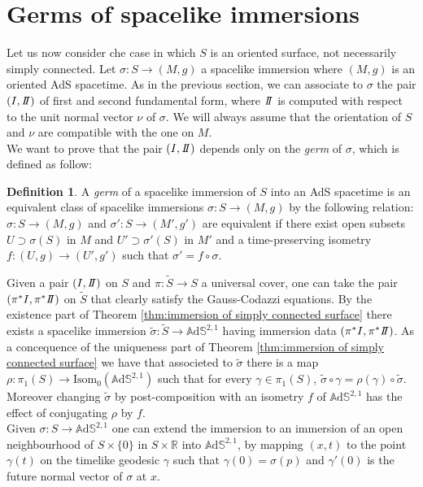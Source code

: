 \documentclass[10pt,a4paper,oneside,reqno]{book}
\def\R{\mathbb{R}}
\def\A{\mathbb{A}\mathrm{d}\mathbb{S}}
\newcommand{\I}{I}
\newcommand{\II}{I\hspace{-0.1cm}I}
\theoremstyle{plain}
\theoremstyle{definition}
\newtheorem{definition}[theorem]{Definition} %
\theoremstyle{plain}
\theoremstyle{plain}
\theoremstyle{mystyleNormalFont}
\begin{document}
\section{Germs of spacelike immersions}
Let us now consider che case in which $S$ is an oriented surface, not necessarily simply connected. Let $\sigma: S \to(M,g)$ a spacelike immersion where $(M,g)$ is an oriented AdS spacetime.
As in the previous section, we can associate to $\sigma$ the pair $(\I,\II)$ of first and second  fundamental form, where $\II$ is  computed with respect to the unit normal vector $\nu$ of $\sigma$.
We will always assume that the orientation of $S$ and $\nu$ are compatible with the one on $M$.\\
We want to prove that the pair $(\I,\II)$ depends only on the \textit{germ} of $\sigma$, which is defined as follow:
\begin{definition}
    A \textit{germ} of a spacelike immersion of $S$ into an AdS spacetime is an equivalent class of spacelike immersions $\sigma:S \to(M,g)$ by the following relation: $\sigma:S \to(M,g)$ and $\sigma':S \to(M',g')$ are equivalent if there exist open subsets $U \supset \sigma(S)$ in $M$ and $U' \supset \sigma'(S)$ in $M'$ and a time-preserving isometry $f:(U,g)\to(U',g')$ such that $\sigma' = f \circ \sigma$.
\end{definition}
Given a pair $(\I,\II)$ on $S$ and $\pi: \widetilde{S}\to S$ a universal cover, one can take the pair $(\pi^*\I, \pi^*\II)$ on $\widetilde{S}$ that clearly satisfy the Gauss-Codazzi equations. By the existence part of Theorem \ref{thm:immersion of simply connected surface} there exists a spacelike immersion $\widetilde{\sigma}: \widetilde{S} \to\A^{2,1}$ having immersion data $(\pi^*\I, \pi^*\II)$. As a concequence of the uniqueness part of Theorem \ref{thm:immersion of simply connected surface} we have that associeted to $\widetilde{\sigma}$ there is a map $\rho:\pi_1(S) \to \text{Isom}_0(\A^{2,1})$ such that for every $\gamma \in \pi_1(S)$, $\widetilde{\sigma} \circ \gamma = \rho(\gamma) \circ \widetilde{\sigma}$. Moreover changing $\widetilde{\sigma}$ by post-composition with an isometry $f$ of $\A^{2,1}$ has the effect of conjugating $\rho$ by $f$.\\
Given $\sigma:S \to \A^{2,1}$ one can extend the immersion to an immersion of an open neighbourhood of $S \times\{0\}$ in $S\times\R$ into $\A^{2,1}$, by mapping $(x,t)$ to the point $\gamma(t)$ on the timelike geodesic $\gamma$ such that $\gamma(0)=\sigma(p)$ and $\gamma'(0)$ is the future normal vector of $\sigma$ at $x$.
\end{document}
